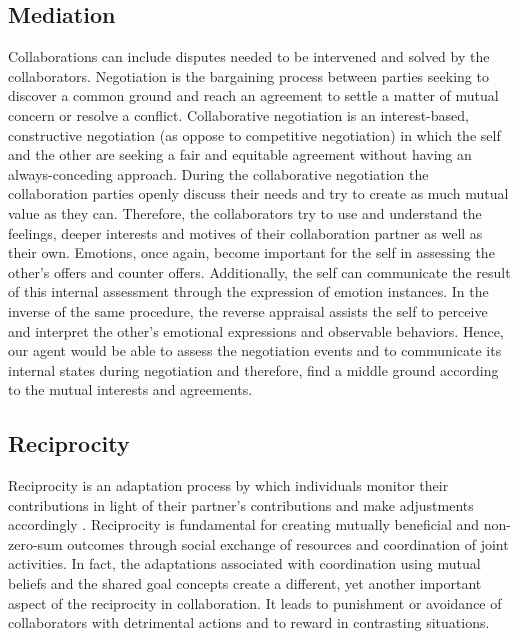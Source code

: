 \documentclass[letterpaper]{article}
\begin{document}
\subsection{Mediation} Collaborations can include disputes needed to be
intervened and solved by the collaborators. Negotiation is the bargaining
process between parties seeking to discover a common ground and reach an
agreement to settle a matter of mutual concern or resolve a conflict.
Collaborative negotiation is an interest-based, constructive negotiation (as
oppose to competitive negotiation) in which the self and the other are
seeking a fair and equitable agreement without having an always-conceding
approach. During the collaborative negotiation the collaboration parties openly
discuss their needs and try to create as much mutual value as they can.
Therefore, the collaborators try to use and understand the feelings, deeper
interests and motives of their collaboration partner as well as their own.
Emotions, once again, become important for the self in assessing the
other's offers and counter offers. Additionally, the self can
communicate the result of this internal assessment through the expression of
emotion instances. In the inverse of the same procedure, the reverse appraisal
assists the self to perceive and interpret the other's emotional
expressions and observable behaviors. Hence, our agent would be able to assess
the negotiation events and to communicate its internal states during negotiation
and therefore, find a middle ground according to the mutual interests and
agreements.

\subsection{Reciprocity} Reciprocity is an adaptation process by which
individuals monitor their contributions in light of their partner's
contributions and make adjustments accordingly
\cite{cole:reciprocity-collaboration}. Reciprocity is fundamental for creating
mutually beneficial and non-zero-sum outcomes through social exchange of
resources and coordination of joint activities. In fact, the adaptations
associated with coordination using mutual beliefs and the shared goal concepts
create a different, yet another important aspect of the reciprocity in
collaboration. It leads to punishment or avoidance of collaborators with
detrimental actions and to reward in contrasting situations.
  
\end{document}

